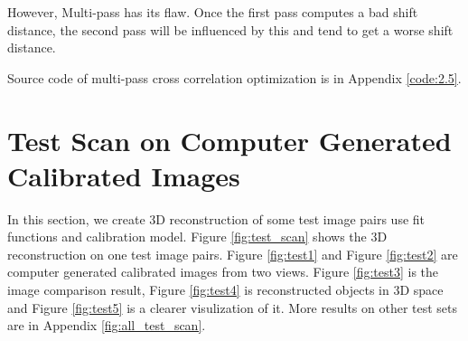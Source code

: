 However, Multi-pass has its flaw. Once the first pass computes a bad shift distance, the second pass will be influenced by this and tend to get a worse shift distance.

Source code of multi-pass cross correlation optimization is in Appendix \ref{code:2.5}.

\section{Test Scan on Computer Generated Calibrated Images}

In this section, we create 3D reconstruction of some test image pairs use fit functions and calibration model. Figure \ref{fig:test_scan} shows the 3D reconstruction on one test image pairs. Figure \ref{fig:test1} and Figure \ref{fig:test2} are computer generated calibrated images from two views. Figure \ref{fig:test3} is the image comparison result, Figure \ref{fig:test4} is reconstructed objects in 3D space and Figure \ref{fig:test5} is a clearer visulization of it. More results on other test sets are in Appendix \ref{fig:all_test_scan}.

